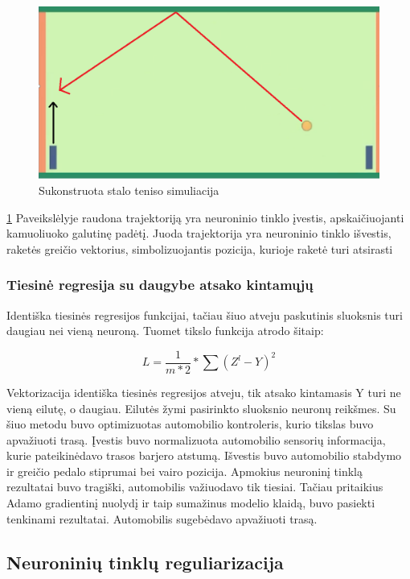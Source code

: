 \documentclass[a4paper, 12pt]{article}
\begin{document}
\begin{figure}[h]
\centering
\includegraphics[width=1\textwidth]{pingpong}
\caption{Sukonstruota stalo teniso simuliacija}
\label{pingpong}
\end{figure}

\ref{pingpong} Paveikslėlyje raudona trajektoriją yra neuroninio tinklo įvestis, apskaičiuojanti kamuoliuoko galutinę padėtį. Juoda trajektorija yra neuroninio tinklo išvestis, raketės greičio vektorius, simbolizuojantis pozicija, kurioje raketė turi atsirasti

%
\subsubsection{Tiesinė regresija su daugybe atsako kintamųjų}
%

Identiška tiesinės regresijos funkcijai, tačiau šiuo atveju paskutinis sluoksnis turi daugiau nei vieną neuroną. Tuomet tikslo funkcija atrodo šitaip:

$$
L=\frac{1}{m * 2} * \sum\left(Z^{l}-Y\right)^{2}
$$

Vektorizacija identiška tiesinės regresijos atveju, tik atsako kintamasis Y turi ne vieną eilutę, o daugiau. Eilutės žymi pasirinkto sluoksnio neuronų reikšmes.
Su šiuo metodu buvo optimizuotas automobilio kontroleris, kurio tikslas buvo apvažiuoti trasą. Įvestis buvo normalizuota automobilio sensorių informacija, kurie pateikinėdavo trasos barjero atstumą. Išvestis buvo automobilio stabdymo ir greičio pedalo stiprumai bei vairo pozicija. Apmokius neuroninį tinklą rezultatai buvo tragiški, automobilis važiuodavo tik tiesiai. Tačiau pritaikius Adamo gradientinį nuolydį ir taip sumažinus modelio klaidą, buvo pasiekti tenkinami rezultatai. Automobilis sugebėdavo apvažiuoti trasą. 

%
\subsection{Neuroninių tinklų reguliarizacija}
%
\end{document}

